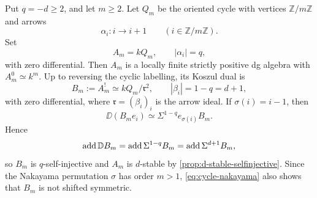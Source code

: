 \documentclass[11pt,a4paper,dvipsnames,x11names]{amsart}
\begin{document}
\begin{exa}\label{exa:cyclic-family}
Put $q=-d\geq2$, and let $m\geq2$. Let $Q_m$ be the oriented cycle with vertices $\mathbb Z/m\mathbb Z$ and arrows
\[
\alpha_i:i\longrightarrow i+1
\qquad(i\in\mathbb Z/m\mathbb Z).
\]
Set
\[
A_m=kQ_m,
\qquad |\alpha_i|=q,
\]
with zero differential. Then $A_m$ is a locally finite strictly positive dg algebra with $A_m^0\simeq k^m$. Up to reversing the cyclic labelling, its Koszul dual is
\[
B_m:=A_m^!\simeq kQ_m/\mathfrak r^2,
\qquad |\beta_i|=1-q=d+1,
\]
with zero differential, where $\mathfrak r=(\beta_i)_i$ is the arrow ideal. If $\sigma(i)=i-1$, then
\begin{equation}\label{eq:cycle-nakayama}
\DD(B_me_i)\simeq\Sigma^{1-q}e_{\sigma(i)}B_m.
\end{equation}
Hence
\[
\operatorname{add}\mathbb D B_m=\operatorname{add}\Sigma^{1-q}B_m=\operatorname{add}\Sigma^{d+1}B_m,
\]
so $B_m$ is $q$-self-injective and $A_m$ is $d$-stable by \cref{prop:d-stable-selfinjective}. Since the Nakayama permutation $\sigma$ has order $m>1$, \eqref{eq:cycle-nakayama} also shows that $B_m$ is not shifted symmetric.


\end{exa}
\end{document}
